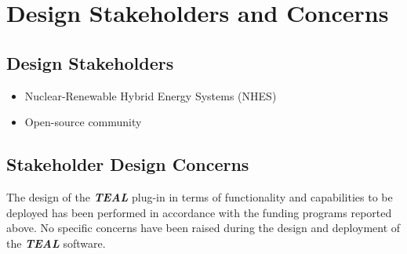 \section{Design Stakeholders and Concerns}
\subsection{Design Stakeholders}
\begin{itemize}
  \item Nuclear-Renewable Hybrid Energy Systems (NHES)
  \item Open-source community 
\end{itemize}
\subsection{Stakeholder Design Concerns}
The design of the \textbf{\textit{TEAL}} plug-in in terms of functionality and capabilities to be deployed has been performed in
accordance with the funding programs reported above. No specific concerns have been raised during the design and 
deployment of the \textbf{\textit{TEAL}} software. 
